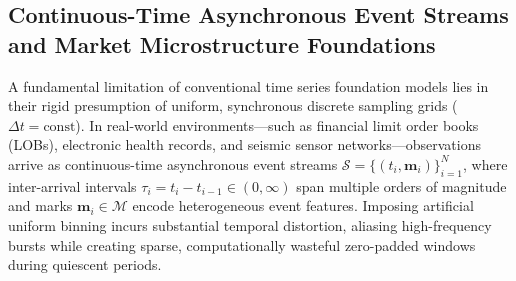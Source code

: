 \subsection{Continuous-Time Asynchronous Event Streams and Market Microstructure Foundations}
\label{sec:asynchronous_event_foundations}

A fundamental limitation of conventional time series foundation models lies in their rigid presumption of uniform, synchronous discrete sampling grids ($\Delta t = \text{const}$). In real-world environments---such as financial limit order books (LOBs), electronic health records, and seismic sensor networks---observations arrive as continuous-time asynchronous event streams $\mathcal{S} = \{(t_i, \mathbf{m}_i)\}_{i=1}^N$, where inter-arrival intervals $\tau_i = t_i - t_{i-1} \in (0, \infty)$ span multiple orders of magnitude and marks $\mathbf{m}_i \in \mathcal{M}$ encode heterogeneous event features. Imposing artificial uniform binning incurs substantial temporal distortion, aliasing high-frequency bursts while creating sparse, computationally wasteful zero-padded windows during quiescent periods.

